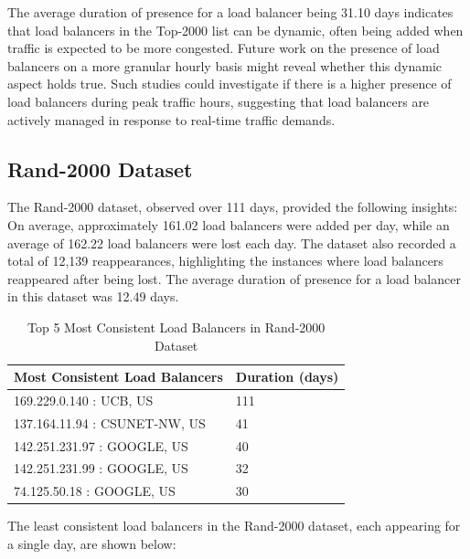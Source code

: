 \documentclass[12pt]{cwru_thesis}
\begin{document}
The average duration of presence for a load balancer being 31.10 days indicates that load balancers in the Top-2000 list can be dynamic, often being added when traffic is expected to be more congested. Future work on the presence of load balancers on a more granular hourly basis might reveal whether this dynamic aspect holds true. Such studies could investigate if there is a higher presence of load balancers during peak traffic hours, suggesting that load balancers are actively managed in response to real-time traffic demands.

\newpage

\subsection{Rand-2000 Dataset}

The Rand-2000 dataset, observed over 111 days, provided the following insights: On average, approximately 161.02 load balancers were added per day, while an average of 162.22 load balancers were lost each day. The dataset also recorded a total of 12,139 reappearances, highlighting the instances where load balancers reappeared after being lost. The average duration of presence for a load balancer in this dataset was 12.49 days.

\begin{table}[h!]
    \centering
    \begin{tabular}{|l|l|}
        \hline
        \textbf{Most Consistent Load Balancers} & \textbf{Duration (days)} \\ \hline
        169.229.0.140 : UCB, US & 111 \\ \hline
        137.164.11.94 : CSUNET-NW, US & 41 \\ \hline
        142.251.231.97 : GOOGLE, US & 40 \\ \hline
        142.251.231.99 : GOOGLE, US & 32 \\ \hline
        74.125.50.18 : GOOGLE, US & 30 \\ \hline
    \end{tabular}
    \caption{Top 5 Most Consistent Load Balancers in Rand-2000 Dataset}
\end{table}

The least consistent load balancers in the Rand-2000 dataset, each appearing for a single day, are shown below:
\end{document}
